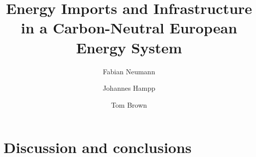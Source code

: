 \documentclass[5p,9pt]{elsarticle}
\begin{document}
\begin{frontmatter}

	\title{Energy Imports and Infrastructure in a Carbon-Neutral European Energy System}
    
	\author[tub]{Fabian Neumann}
	\author[pik]{Johannes Hampp}
	\author[tub]{Tom Brown}
	
	\address[tub]{Department of Digital Transformation in Energy Systems, Institute of Energy Technology,\\Technische Universität Berlin, Fakultät III, Einsteinufer 25 (TA 8), 10587 Berlin, Germany}
	\address[pik]{Potsdam Institute for Climate Impact Research (PIK), Member of the Leibniz Association, P.O.~Box 60 12 03, 14412 Potsdam, Germany}

	\begin{abstract}
		
	\end{abstract}




\end{frontmatter}









\section*{Discussion and conclusions}
\label{sec:discussion}
\end{document}

